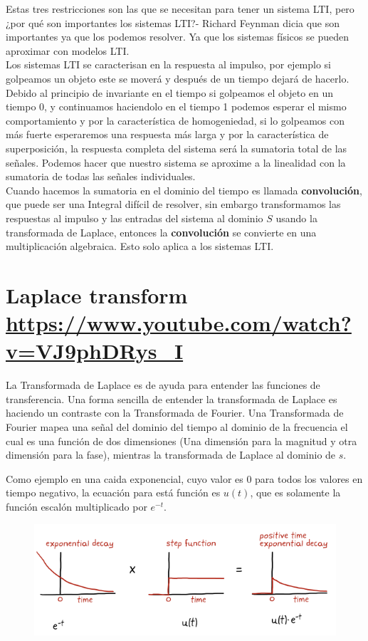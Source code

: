 \documentclass[
	12pt, %
]{fphw}
\begin{document}
Estas tres restricciones son las que se necesitan para tener un sistema LTI, pero ¿por qué son importantes los sistemas LTI?- Richard Feynman dicia que son importantes ya que los podemos resolver. Ya que los sistemas físicos se pueden aproximar con modelos LTI.\\

Los sistemas LTI se caracterisan en la respuesta al impulso, por ejemplo si golpeamos un objeto este se moverá y después de un tiempo dejará de hacerlo. Debido al principio de invariante en el tiempo si golpeamos el objeto en un tiempo 0, y continuamos haciendolo en el tiempo 1 podemos esperar el mismo comportamiento y por la característica de homogeniedad, si lo golpeamos con más fuerte esperaremos una respuesta más larga y por la característica de superposición, la respuesta completa del sistema será la sumatoria total de las señales. Podemos hacer que nuestro sistema se aproxime a la linealidad con la sumatoria de todas las señales individuales.\\

Cuando hacemos la sumatoria en el dominio del tiempo es llamada \textbf{convolución}, que puede ser una Integral difícil de resolver, sin embargo transformamos las respuestas al impulso y las entradas del sistema al dominio $S$ usando la transformada de Laplace, entonces la \textbf{convolución} se convierte en una multiplicación algebraica. Esto solo aplica a los sistemas LTI.

\newpage
\section*{{\color{RoyalPurple}Laplace transform} \url{https://www.youtube.com/watch?v=VJ9phDRys_I}}

La Transformada de Laplace es de ayuda para entender las funciones de transferencia. Una forma sencilla de entender la transformada de Laplace es haciendo un contraste con la Transformada de Fourier. Una Transformada de Fourier mapea una señal del dominio del tiempo al dominio de la frecuencia el cual es una función de dos dimensiones (Una dimensión para la magnitud y otra dimensión para la fase), mientras la transformada de Laplace al dominio de $s$.

Como ejemplo en una caida exponencial, cuyo valor es 0 para todos los valores en tiempo negativo, la ecuación para está función es $u(t)$, que es solamente la función escalón multiplicado por $e^{-t}$.

\begin{figure}[H]
  \centering
  \includegraphics[scale=0.6]{images/decay_function.png}
\end{figure}
\end{document}
